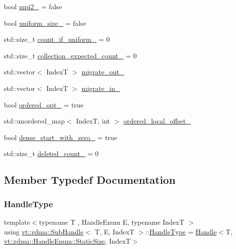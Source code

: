\begin{DoxyCompactItemize}
bool \hyperlink{structvt_1_1rdma_1_1_sub_handle_a780ccbe4a6a728cba4a45d0d7cabe02b}{mpi2\+\_\+} = false
\item 
bool \hyperlink{structvt_1_1rdma_1_1_sub_handle_ab6c87db6739367bdbd95be5a8f673fc8}{uniform\+\_\+size\+\_\+} = false
\item 
std\+::size\+\_\+t \hyperlink{structvt_1_1rdma_1_1_sub_handle_a0e764c3fd8c4601a58ae396b2253d1fd}{count\+\_\+if\+\_\+uniform\+\_\+} = 0
\item 
std\+::size\+\_\+t \hyperlink{structvt_1_1rdma_1_1_sub_handle_a4bec3a89845f7818e60afd1bc9ad611e}{collection\+\_\+expected\+\_\+count\+\_\+} = 0
\item 
std\+::vector$<$ IndexT $>$ \hyperlink{structvt_1_1rdma_1_1_sub_handle_a13c434425c8ab69abfd202acf8979119}{migrate\+\_\+out\+\_\+}
\item 
std\+::vector$<$ IndexT $>$ \hyperlink{structvt_1_1rdma_1_1_sub_handle_a2832d6a83d0ecc36d342d33fcf5ce6dd}{migrate\+\_\+in\+\_\+}
\item 
bool \hyperlink{structvt_1_1rdma_1_1_sub_handle_a3675b46b618cd10df2ba80df3c084717}{ordered\+\_\+opt\+\_\+} = true
\item 
std\+::unordered\+\_\+map$<$ IndexT, int $>$ \hyperlink{structvt_1_1rdma_1_1_sub_handle_a384d5a4c7b19a6bfd9546769d7da1e85}{ordered\+\_\+local\+\_\+offset\+\_\+}
\item 
bool \hyperlink{structvt_1_1rdma_1_1_sub_handle_a21a1dd0a0dda531cb1153d58c5bad18b}{dense\+\_\+start\+\_\+with\+\_\+zero\+\_\+} = true
\item 
std\+::size\+\_\+t \hyperlink{structvt_1_1rdma_1_1_sub_handle_af2147cd68e8f323bad1e63c83f529bfe}{deleted\+\_\+count\+\_\+} = 0
\end{DoxyCompactItemize}


\subsection{Member Typedef Documentation}
\mbox{\label{structvt_1_1rdma_1_1_sub_handle_a782bd6ddc85c6a81d7f55d207fad71cd}} 
\subsubsection{\texorpdfstring{Handle\+Type}{HandleType}}
{\footnotesize\ttfamily template$<$typename T , Handle\+Enum E, typename IndexT $>$ \\
using \hyperlink{structvt_1_1rdma_1_1_sub_handle}{vt\+::rdma\+::\+Sub\+Handle}$<$ T, E, IndexT $>$\+::\hyperlink{structvt_1_1rdma_1_1_sub_handle_a782bd6ddc85c6a81d7f55d207fad71cd}{Handle\+Type} =  \hyperlink{structvt_1_1rdma_1_1_handle}{Handle}$<$T, \hyperlink{namespacevt_1_1rdma_a0234ff19cfb3c04718cfdfd36b2d6d88a0c5c41d6a0319a61d3a5e8a060b7c4d7}{vt\+::rdma\+::\+Handle\+Enum\+::\+Static\+Size}, IndexT$>$}

